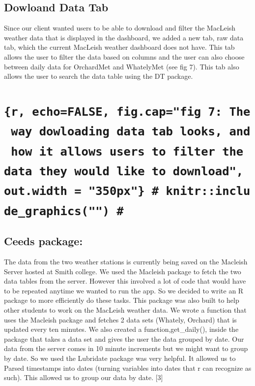 \documentclass[10pt,letterpaper]{article}
\begin{document}
\subsection{Dowloand Data Tab}\label{dowloand-data-tab}

Since our client wanted users to be able to download and filter the
MacLeish weather data that is displayed in the dashboard, we added a new
tab, raw data tab, which the current MacLeish weather dashboard does not
have. This tab allows the user to filter the data based on columns and
the user can also choose between daily data for OrchardMet and
WhatelyMet (see fig 7). This tab also allows the user to search the data
table using the DT package.

\section{\texorpdfstring{\texttt{\{r,\ echo=FALSE,\ fig.cap="fig\ 7:\ The\ way\ dowloading\ data\ tab\ looks,\ and\ how\ it\ allows\ users\ to\ filter\ the\ data\ they\ would\ like\ to\ download",\ out.width\ =\ "350px"\}\ \#\ knitr::include\_graphics("")\ \#}}{\{r, echo=FALSE, fig.cap="fig 7: The way dowloading data tab looks, and how it allows users to filter the data they would like to download", out.width = "350px"\} \# knitr::include\_graphics("") \#}}\label{r-echofalse-fig.capfig-7-the-way-dowloading-data-tab-looks-and-how-it-allows-users-to-filter-the-data-they-would-like-to-download-out.width-350px-knitrinclude_graphics}

\subsection{Ceeds package:}\label{ceeds-package}

The data from the two weather stations is currently being saved on the
Macleish Server hosted at Smith college. We used the Macleish package to
fetch the two data tables from the server. However this involved a lot
of code that would have to be repeated anytime we wanted to run the app.
So we decided to write an R package to more efficiently do these tasks.
This package was also built to help other students to work on the
MacLeish weather data. We wrote a function that uses the Macleish
package and fetches 2 data sets (Whately, Orchard) that is updated every
ten minutes. We also created a function,get\_daily(), inside the package
that takes a data set and gives the user the data grouped by date. Our
data from the server comes in 10 minute increments but we might want to
group by date. So we used the Lubridate package was very helpful. It
allowed us to Parsed timestamps into dates (turning variables into dates
that r can recognize as such). This allowed us to group our data by
date. {[}3{]}
\end{document}

